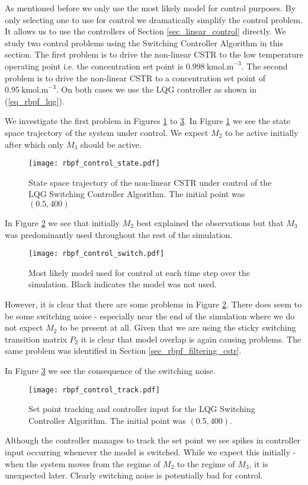 As mentioned before we only use the most likely model for control purposes. By only selecting one to use for control we dramatically simplify the control problem. It allows us to use the controllers of Section \ref{sec_linear_control} directly. We study two control problems using the Switching Controller Algorithm in this section. The first problem is to drive the non-linear CSTR to the low temperature operating point i.e. the concentration set point is $0.998~\text{kmol.m}^{-3}$. The second problem is to drive the non-linear CSTR to a concentration set point of $0.95~\text{kmol.m}^{-3}$. On both cases we use the LQG controller as shown in (\ref{eq_rbpf_lqg}).

We investigate the first problem in Figures \ref{fig_rbpf_control_state} to \ref{fig_rbpf_control_track}. In Figure \ref{fig_rbpf_control_state} we see the state space trajectory of the system under control. We expect $M_2$ to be active initially after which only $M_3$ should be active.
\begin{figure}[H] 
\centering
\texttt{[image: rbpf\_control\_state.pdf]}
\caption{State space trajectory of the non-linear CSTR under control of the LQG Switching Controller Algorithm. The initial point was $(0.5, 400)$}
\label{fig_rbpf_control_state}
\end{figure}
In Figure \ref{fig_rbpf_control_switch} we see that initially $M_2$ best explained the observations but that $M_3$ was predominantly used throughout the rest of the simulation.   
\begin{figure}[H] 
\centering
\texttt{[image: rbpf\_control\_switch.pdf]}
\caption{Most likely model used for control at each time step over the simulation. Black indicates the model was not used.}
\label{fig_rbpf_control_switch}
\end{figure}
However, it is clear that there are some problems in Figure \ref{fig_rbpf_control_switch}. There does seem to be some switching noise - especially near the end of the simulation where we do not expect $M_2$ to be present at all. Given that we are using the sticky switching transition matrix $P_2$ it is clear that model overlap is again causing problems. The same problem was identified in Section \ref{sec_rbpf_filtering_cstr}.

In Figure \ref{fig_rbpf_control_track} we see the consequence of the switching noise.
\begin{figure}[H] 
\centering
\texttt{[image: rbpf\_control\_track.pdf]}
\caption{Set point tracking and controller input for the LQG Switching Controller Algorithm. The initial point was $(0.5, 400)$.}
\label{fig_rbpf_control_track}
\end{figure}
Although the controller manages to track the set point we see spikes in controller input occurring whenever the model is switched. While we expect this initially - when the system moves from the regime of $M_2$ to the regime of $M_3$, it is unexpected later. Clearly switching noise is potentially bad for control.

